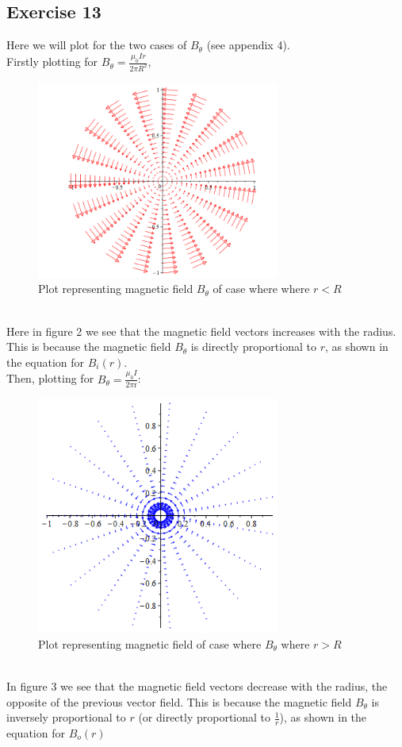 \documentclass{article}
\begin{document}
\subsection{Exercise 13}
Here we will plot for the two cases of $B_\theta$ (see appendix 4).
\\
Firstly plotting for $B_{\theta}=\frac{\mu_{0}\mathit{Ir}}{2\pi R^{2}}$,
\begin{figure}[h!]
\includegraphics[width=8cm]{exercise13.PNG}
\centering
\caption{Plot representing magnetic field $B_\theta$ of case where where $r < R$}
\end{figure}
 \\
 Here in figure 2 we see that the magnetic field vectors increases with the radius. This is because the magnetic field $B_\theta$ is directly proportional to $r$, as shown in the equation for $B_{i}\left(r\right)$.
\newpage
\\
Then, plotting for $B_{\theta}=\frac{\mu_{0}I}{2\pi \mathrm{r}}$:
\begin{figure}[h!]
\includegraphics[width=8cm]{halbach_magfield2.png}
\centering
\caption{Plot representing magnetic field of case where $B_\theta$ where $r > R$}
\end{figure}
\\
In figure 3 we see that the magnetic field vectors decrease with the radius, the opposite of the previous vector field. This is because the magnetic field $B_\theta$ is inversely proportional to $r$ (or directly proportional to $\frac{1}{r}$), as shown in the equation for $B_{o}\left(r\right)$
\end{document}
